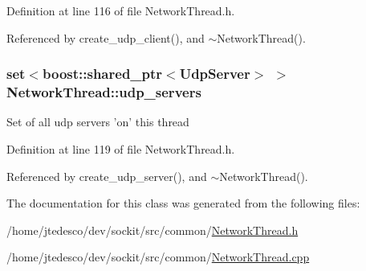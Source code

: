 Definition at line 116 of file NetworkThread.h.



Referenced by create\_\-udp\_\-client(), and $\sim$NetworkThread().

\hypertarget{classNetworkThread_acd2cc1475b8ebeafd3e7dafc835dbec4}{
\subsubsection[{udp\_\-servers}]{\setlength{\rightskip}{0pt plus 5cm}set$<$boost::shared\_\-ptr$<${\bf UdpServer}$>$ $>$ {\bf NetworkThread::udp\_\-servers}}}
\label{classNetworkThread_acd2cc1475b8ebeafd3e7dafc835dbec4}
Set of all udp servers 'on' this thread 

Definition at line 119 of file NetworkThread.h.



Referenced by create\_\-udp\_\-server(), and $\sim$NetworkThread().



The documentation for this class was generated from the following files:\begin{DoxyCompactItemize}
\item 
/home/jtedesco/dev/sockit/src/common/\hyperlink{NetworkThread_8h}{NetworkThread.h}\item 
/home/jtedesco/dev/sockit/src/common/\hyperlink{NetworkThread_8cpp}{NetworkThread.cpp}\end{DoxyCompactItemize}

